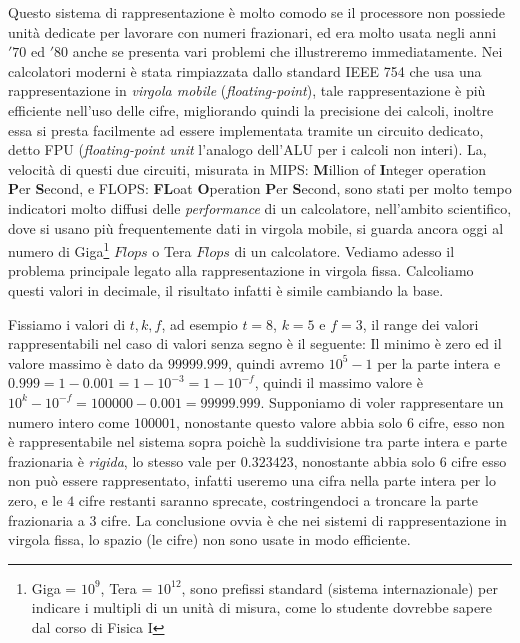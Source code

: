 Questo sistema di rappresentazione è molto comodo se il processore non possiede unità dedicate per lavorare con numeri frazionari, ed era molto usata negli anni $'70$ ed $'80$ anche se presenta vari problemi che illustreremo immediatamente. Nei calcolatori moderni è stata rimpiazzata dallo standard IEEE 754 che usa una rappresentazione in \emph{virgola mobile} (\emph{floating-point}), tale rappresentazione è più efficiente nell'uso delle cifre, migliorando quindi la precisione dei calcoli, inoltre essa si presta facilmente ad essere implementata tramite un circuito dedicato, detto FPU (\emph{floating-point unit} l'analogo dell'ALU per i calcoli non interi).
La, velocità di questi due circuiti, misurata in \textsc{MIPS}: \textbf{M}illion of \textbf{I}nteger operation \textbf{P}er \textbf{S}econd, e \textsc{FLOPS}: \textbf{FL}oat \textbf{O}peration \textbf{P}er \textbf{S}econd, sono stati per molto tempo indicatori molto diffusi delle \emph{performance} di un calcolatore, nell'ambito scientifico, dove si usano più frequentemente dati in virgola mobile, si guarda ancora oggi al numero di Giga\footnote{Giga = $10^9$, Tera = $10^{12}$, sono prefissi standard (sistema internazionale) per indicare i multipli di un unità di misura, come lo studente dovrebbe sapere dal corso di Fisica I} $Flops$ o Tera $Flops$ di un calcolatore.  Vediamo adesso il problema principale legato alla rappresentazione in virgola fissa. Calcoliamo questi valori in decimale, il risultato infatti è simile cambiando la base.

Fissiamo i valori di $t, k, f$, ad esempio $t = 8$, $k = 5$ e $f = 3$, il range dei valori rappresentabili nel caso di valori senza segno è il seguente: Il minimo è zero ed il valore massimo è dato da $99999.999$, quindi avremo $10^5 - 1$ per la parte intera e $0.999 = 1-0.001 = 1 - 10^{-3} = 1-10^{-f}$, quindi il massimo valore è $10^k-10^{-f} = 100000 - 0.001 = 99999.999$.
Supponiamo di voler rappresentare un numero intero come $100001$, nonostante
questo valore abbia solo $6$ cifre, esso non è rappresentabile nel sistema sopra poichè la suddivisione tra parte intera e parte frazionaria è \emph{rigida}, lo stesso vale per $0.323423$, nonostante abbia solo $6$ cifre esso non può essere rappresentato, infatti useremo una cifra nella parte intera per lo zero, e le $4$ cifre restanti saranno sprecate, costringendoci a troncare la parte frazionaria a $3$ cifre. La conclusione ovvia è che nei sistemi di rappresentazione in virgola fissa, lo spazio (le cifre) non sono usate in modo efficiente.

